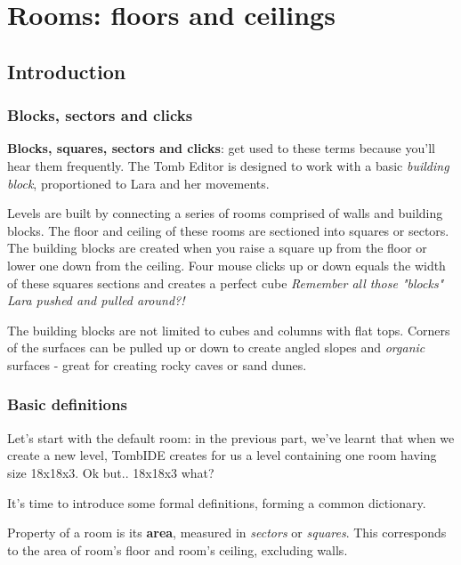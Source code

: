 \part{Rooms: floors and ceilings}

\chapter{Introduction}

\section{Blocks, sectors and clicks}

\textbf{Blocks, squares, sectors and clicks}: get used to these terms because you'll hear them frequently. The Tomb Editor is designed to work with a basic \emph{building block}, proportioned to Lara and her movements.
\par Levels are built by connecting a series of rooms comprised of walls and building blocks. The floor and ceiling of these rooms are sectioned into squares or sectors. The building blocks are created when you raise a square up from the floor or lower one down from the ceiling. Four mouse clicks up or down equals the width of these squares sections and creates a perfect cube \emph{Remember all those "blocks" Lara pushed and pulled around?!}
\par The building blocks are not limited to cubes and columns with flat tops. Corners of the surfaces can be pulled up or down to create angled slopes and \emph{organic} surfaces - great for creating rocky caves or sand dunes. \cite{trle_manual}

\section{Basic definitions}

Let's start with the default room: in the previous part, we've learnt that when we create a new level, TombIDE creates for us a level containing one room having size 18x18x3. Ok but.. 18x18x3 what?

It's time to introduce some formal definitions, forming a common dictionary.

\begin{remark}
    Property of a room is its \textbf{area}, measured in \emph{sectors} or \emph{squares}. This corresponds to the area of room's floor and room's ceiling, excluding walls.
\end{remark}

